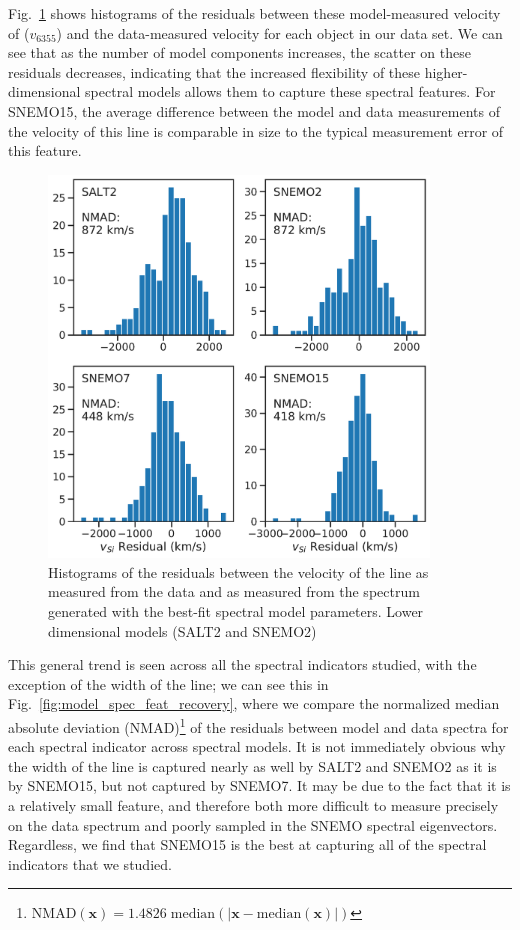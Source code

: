 Fig.~\ref{fig:model_vSi_recovery} shows histograms of the residuals between these model-measured velocity of \SiIIred{} ($v_{6355}$) and the data-measured velocity for each object in our data set. We can see that as the number of model components increases, the scatter on these residuals decreases, indicating that the increased flexibility of these higher-dimensional spectral models allows them to capture these spectral features. For SNEMO15, the average difference between the model and data measurements of the velocity of this line is comparable in size to the typical measurement error of this feature.

\begin{figure}
    \centering
    \includegraphics[width=0.9\textwidth]{figures/snemo_kde/model_vSi_recovery.pdf}
    \caption{Histograms of the residuals between the velocity of the \SiIIred{} line as measured from the data and as measured from the spectrum generated with the best-fit spectral model parameters. Lower dimensional models (SALT2 and SNEMO2) }
    \label{fig:model_vSi_recovery}
\end{figure}

This general trend is seen across all the spectral indicators studied, with the exception of the width of the \SiIIblue{} line; we can see this in Fig.~\ref{fig:model_spec_feat_recovery}, where we compare the normalized median absolute deviation (NMAD)\footnote{$\text{NMAD}(\bm{x})=1.4826\;\text{median}(|\bm{x}-\text{median}(\bm{x})|)$} of the residuals between model and data spectra for each spectral indicator across spectral models. It is not immediately obvious why the width of the \SiIIblue{} line is captured nearly as well by SALT2 and SNEMO2 as it is by SNEMO15, but not captured by SNEMO7. It may be due to the fact that it is a relatively small feature, and therefore both more difficult to measure precisely on the data spectrum and poorly sampled in the SNEMO spectral eigenvectors. Regardless, we find that SNEMO15 is the best at capturing all of the spectral indicators that we studied.

